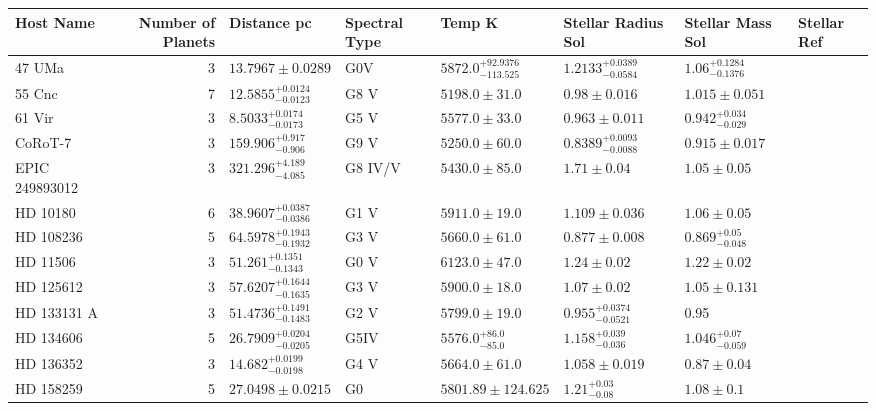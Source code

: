 \begin{tabular}{lrllllll}
\toprule
Host Name & Number of Planets & Distance pc & Spectral Type & Temp K & Stellar Radius Sol & Stellar Mass Sol & Stellar Ref \\
\midrule
47 UMa & 3 & $13.7967 \pm 0.0289$ & G0V & $5872.0^{+92.9376}_{-113.525}$ & $1.2133^{+0.0389}_{-0.0584}$ & $1.06^{+0.1284}_{-0.1376}$ & \cite{STASSUN_ET_AL__2019} \\
55 Cnc & 7 & $12.5855^{+0.0124}_{-0.0123}$ & G8 V & $5198.0 \pm 31.0$ & $0.98 \pm 0.016$ & $1.015 \pm 0.051$ & \cite{MOUTOU_ET_AL_2026} \\
61 Vir & 3 & $8.5033^{+0.0174}_{-0.0173}$ & G5 V & $5577.0 \pm 33.0$ & $0.963 \pm 0.011$ & $0.942^{+0.034}_{-0.029}$ & \cite{VOGT_ET_AL__2010} \\
CoRoT-7 & 3 & $159.906^{+0.917}_{-0.906}$ & G9 V & $5250.0 \pm 60.0$ & $0.8389^{+0.0093}_{-0.0088}$ & $0.915 \pm 0.017$ & \cite{JOHN_ET_AL_2022} \\
EPIC 249893012 & 3 & $321.296^{+4.189}_{-4.085}$ & G8 IV/V & $5430.0 \pm 85.0$ & $1.71 \pm 0.04$ & $1.05 \pm 0.05$ & \cite{HIDALGO_ET_AL__2020} \\
HD 10180 & 6 & $38.9607^{+0.0387}_{-0.0386}$ & G1 V & $5911.0 \pm 19.0$ & $1.109 \pm 0.036$ & $1.06 \pm 0.05$ & \cite{KANE__AMP__GELINO_2014} \\
HD 108236 & 5 & $64.5978^{+0.1943}_{-0.1932}$ & G3 V & $5660.0 \pm 61.0$ & $0.877 \pm 0.008$ & $0.869^{+0.05}_{-0.048}$ & \cite{BONFANTI_ET_AL__2021} \\
HD 11506 & 3 & $51.261^{+0.1351}_{-0.1343}$ & G0 V & $6123.0 \pm 47.0$ & $1.24 \pm 0.02$ & $1.22 \pm 0.02$ & \cite{RUGGIERI_ET_AL__2024} \\
HD 125612 & 3 & $57.6207^{+0.1644}_{-0.1635}$ & G3 V & $5900.0 \pm 18.0$ & $1.07 \pm 0.02$ & $1.05 \pm 0.131$ & \cite{LO_CURTO_ET_AL__2010} \\
HD 133131 A & 3 & $51.4736^{+0.1491}_{-0.1483}$ & G2 V & $5799.0 \pm 19.0$ & $0.955^{+0.0374}_{-0.0521}$ & 0.95 & \cite{TESKE_ET_AL__2016} \\
HD 134606 & 5 & $26.7909^{+0.0204}_{-0.0205}$ & G5IV & $5576.0^{+86.0}_{-85.0}$ & $1.158^{+0.039}_{-0.036}$ & $1.046^{+0.07}_{-0.059}$ & \cite{LI_ET_AL_2024} \\
HD 136352 & 3 & $14.682^{+0.0199}_{-0.0198}$ & G4 V & $5664.0 \pm 61.0$ & $1.058 \pm 0.019$ & $0.87 \pm 0.04$ & \cite{DELREZ_ET_AL_2021} \\
HD 158259 & 5 & $27.0498 \pm 0.0215$ & G0 & $5801.89 \pm 124.625$ & $1.21^{+0.03}_{-0.08}$ & $1.08 \pm 0.1$ & \cite{EXOFOP} \\

\end{tabular}

